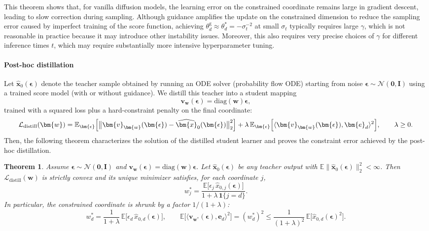 \documentclass{article}
\theoremstyle{plain}
\newtheorem{theorem}{Theorem}[section]
\theoremstyle{definition}
\theoremstyle{remark}
\begin{document}
This theorem shows that, for vanilla diffusion models, the learning error on the constrained coordinate remains large in gradient descent, leading to slow correction during sampling. Although guidance amplifies the update on the constrained dimension to reduce the sampling error caused by imperfect training of the score function, achieving \(\theta_d^{\mathrm{g}} \approx \theta_d^*=-\sigma_t^{-2}\) at small \(\sigma_t\) typically requires large \(\gamma\), which is not reasonable in practice because it may introduce other instability issues. Moreover, this also requires very precise choices of $\gamma$ for different inference times $t$, which may require substantially more intensive hyperparameter tuning.

\paragraph{Post-hoc distillation}
Let \(\widehat{\bm{x}}_0(\bm{\epsilon})\) denote the teacher sample obtained by running an ODE solver (probability flow ODE) starting from noise \(\bm{\epsilon}\sim\mathcal{N}(\bm{0},\bm{I})\) using a trained score model (with or without guidance).
We distill this teacher into a student mapping
\[
\bm{v}_{\bm{w}}(\bm{\epsilon}) = \mathrm{diag}(\bm{w})\bm{\epsilon},
\]
trained with a squared loss plus a hard-constraint penalty on the final coordinate:
\[
\mathcal{L}_{\mathrm{distill}}(\bm{w})
=
\mathbb{E}_{\bm{\epsilon}}
\Bigl[
\bigl\|\bm{v}_{\bm{w}}(\bm{\epsilon})-\widehat{\bm{x}}_0(\bm{\epsilon})\bigr\|_2^2
\Bigr]
+
\lambda\,
\mathbb{E}_{\bm{\epsilon}}
\Bigl[
\langle \bm{v}_{\bm{w}}(\bm{\epsilon}),\bm{e}_d\rangle^2
\Bigr],
\qquad \lambda\ge 0.
\]
Then, the following theorem characterizes the solution of the distilled student learner and proves the constraint error achieved by the post-hoc distillation.
\begin{theorem}
\label{thm:distill_closed_form}
Assume \(\bm{\epsilon}\sim\mathcal{N}(\bm{0},\bm{I})\) and \(\bm{v}_{\bm{w}}(\bm{\epsilon})=\mathrm{diag}(\bm{w})\bm{\epsilon}\).
Let \(\widehat{\bm{x}}_0(\bm{\epsilon})\) be any teacher output with \(\mathbb{E}\|\widehat{\bm{x}}_0(\bm{\epsilon})\|_2^2<\infty\).
Then \(\mathcal{L}_{\mathrm{distill}}(\bm{w})\) is strictly convex and its unique minimizer satisfies, for each coordinate \(j\),
\[
w_j^* =
\frac{\mathbb{E}\bigl[\epsilon_j\,\widehat{x}_{0,j}(\bm{\epsilon})\bigr]}{1+\lambda\,\mathbf{1}\{j=d\}}.
\]
In particular, the constrained coordinate is shrunk by a factor \(1/(1+\lambda)\):
\[
w_d^* = \frac{1}{1+\lambda}\,\mathbb{E}\bigl[\epsilon_d\,\widehat{x}_{0,d}(\bm{\epsilon})\bigr],
\qquad
\mathbb{E}\bigl[\langle \bm{v}_{\bm{w}^*}(\bm{\epsilon}),\bm{e}_d\rangle^2\bigr]
=
(w_d^*)^2
\le \frac{1}{(1+\lambda)^2}\,
\mathbb{E}\bigl[\widehat{x}_{0,d}(\bm{\epsilon})^2\bigr].
\]
\end{theorem}
\end{document}
